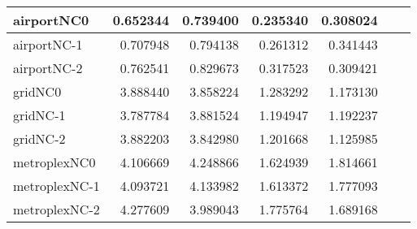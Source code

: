 \begin{longtable}{|l|r|r|r|r|r|r|}
airportNC0 & 0.652344 & 0.739400 & 0.235340 & 0.308024 \\ \hline
airportNC-1 & 0.707948 & 0.794138 & 0.261312 & 0.341443 \\ \hline
airportNC-2 & 0.762541 & 0.829673 & 0.317523 & 0.309421 \\ \hline
gridNC0 & 3.888440 & 3.858224 & 1.283292 & 1.173130 \\ \hline
gridNC-1 & 3.787784 & 3.881524 & 1.194947 & 1.192237 \\ \hline
gridNC-2 & 3.882203 & 3.842980 & 1.201668 & 1.125985 \\ \hline
metroplexNC0 & 4.106669 & 4.248866 & 1.624939 & 1.814661 \\ \hline
metroplexNC-1 & 4.093721 & 4.133982 & 1.613372 & 1.777093 \\ \hline
metroplexNC-2 & 4.277609 & 3.989043 & 1.775764 & 1.689168 \\ \hline
\end{longtable}
